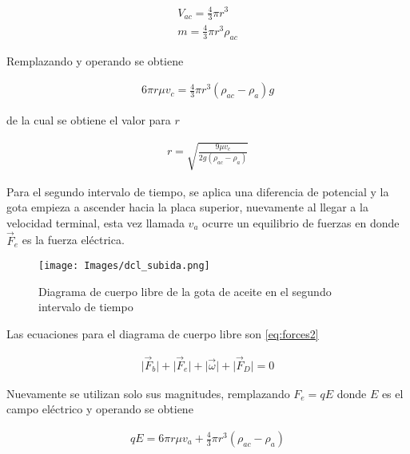 \begin{equation}\label{eq:volume}
    \begin{split}
        V_{ac}=\frac{4}{3}\pi r^3\\
        m=\frac{4}{3}\pi r^3\rho_{ac}
    \end{split}
\end{equation}

Remplazando y operando se obtiene

\begin{equation}
    \begin{split}
        6\pi r\mu v_c=\frac{4}{3}\pi r^3(\rho_{ac}-\rho_a)g
    \end{split}
\end{equation}

de la cual se obtiene el valor para $r$

\begin{equation}
    \begin{split}
        r=\sqrt{\frac{9\mu v_c}{2g(\rho_{ac}-\rho_a)}}
    \end{split}
\end{equation}

Para el segundo intervalo de tiempo, se aplica una diferencia de potencial y la gota empieza a ascender hacia la placa superior, nuevamente al llegar a la velocidad terminal, esta vez llamada $v_a$ ocurre un equilibrio de fuerzas en donde $\Vec{F}_e$ es la fuerza eléctrica.

\begin{figure}
    \centering
    \texttt{[image: Images/dcl\_subida.png]}
    \caption{Diagrama de cuerpo libre de la gota de aceite en el segundo intervalo de tiempo}
    \label{fig:enter-label}
\end{figure}

Las ecuaciones para el diagrama de cuerpo libre son \cref{eq:forces2} 

\begin{equation} \label{eq:forces2}
    \begin{split}
        \lvert\Vec{F}_b\rvert + \lvert \Vec{F}_e\rvert + \lvert \Vec{\omega}\rvert+\lvert \Vec{F}_D\rvert =0
    \end{split}
\end{equation}

Nuevamente se utilizan solo sus magnitudes, remplazando $F_e=qE$ donde $E$ es el campo eléctrico y operando se obtiene

\begin{equation}
    \begin{split}
        qE=6\pi r\mu v_a + \frac{4}{3}\pi r^3(\rho_{ac}-\rho_a)
    \end{split}
\end{equation}

